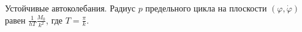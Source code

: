 Устойчивые автоколебания.
Радиус $p$ предельного цикла на плоскости $(\varphi, \dot{\varphi})$
равен $\frac{1}{hT}\frac{M_0}{k^2}$, где $T = \frac{\pi}{k}$.
